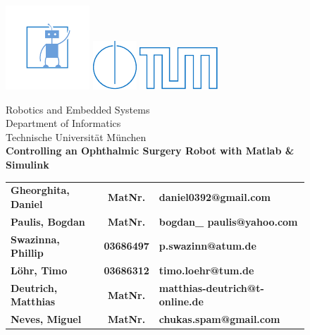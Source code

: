 \begin{figure}[!h]

  \includegraphics{./images/knoll-blue.pdf}  \includegraphics{./images/IN.pdf} \hfill \includegraphics{./images/tumlogo.pdf}

  \vspace*{1cm}
  {\large \textsf{Robotics and Embedded Systems}}\\
  {\large \textsf{Department of Informatics}}\\
  {\large \textsf{Technische Universit{\"a}t M{\"u}nchen}}\\




  \vspace*{5cm}
%
%
%
%
  {\color{tumblue} \Huge \bf \textsf{Controlling an Ophthalmic Surgery Robot with Matlab \& Simulink}}\\  %

  \vspace*{1cm}
%
%
%
%

  \begin{tabular}{l c l}
  	\Large \bf \textsf{Gheorghita, Daniel} & \Large \bf \textsf{MatNr.} & \Large \bf \textsf{daniel0392@gmail.com}\\
  	\Large \bf \textsf{Paulis, Bogdan} & \Large \bf \textsf{MatNr.} & \Large \bf \textsf{bogdan\_ paulis@yahoo.com}\\
  	\Large \bf \textsf{Swazinna, Phillip} & \Large \bf \textsf{03686497} & \Large \bf \textsf{p.swazinn@atum.de}\\
  	\Large \bf \textsf{L\" ohr, Timo} & \Large \bf \textsf{03686312} & \Large \bf \textsf{timo.loehr@tum.de}\\
  	\Large \bf \textsf{Deutrich, Matthias} & \Large \bf \textsf{MatNr.} & \Large \bf \textsf{matthias-deutrich@t-online.de}\\
  	\Large \bf \textsf{Neves, Miguel} & \Large \bf \textsf{MatNr.} & \Large \bf \textsf{chukas.spam@gmail.com}
  \end{tabular}


\end{figure}
